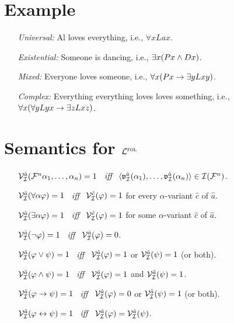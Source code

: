 \documentclass[a4paper, 11pt]{article} %
\begin{document}
\section*{Example}

\begin{enumerate}
  \item[\it Universal:] Al loves everything, i.e., $\forall xLax$.
  \item[\it Existential:] Someone is dancing, i.e., $\exists x(Px \wedge Dx)$.
  \item[\it Mixed:] Everyone loves someone, i.e., $\forall x(Px \rightarrow \exists yLxy)$. 
  \item[\it Complex:] Everything everything loves loves something, i.e., $\forall x(\forall yLyx \rightarrow \exists zLxz)$.
\end{enumerate}



\section*{Semantics for $\mathcal{L}^{\textsc{fol}}$}

\begin{enumerate}
  \item[] $\mathcal{V}_{\mathcal{I}}^{\hat{a}}(\mathcal{F}^n\alpha_1,\ldots,\alpha_n)=1$ ~\textit{iff}~ $\langle\mathfrak{v}_{\mathcal{I}}^{\hat{a}}{(\alpha_1)},\ldots,\mathfrak{v}_{\mathcal{I}}^{\hat{a}}{(\alpha_n)}\rangle\in\mathcal{I}(\mathcal{F}^n)$.
  \item[] $\mathcal{V}_{\mathcal{I}}^{\hat{a}}(\forall\alpha\varphi)=1$ ~\textit{iff}~ $\mathcal{V}_{\mathcal{I}}^{\hat{c}}(\varphi)=1$ for every $\alpha$-variant $\hat{c}$ of $\hat{a}$.
  \item[] $\mathcal{V}_{\mathcal{I}}^{\hat{a}}(\exists\alpha\varphi)=1$ ~\textit{iff}~ $\mathcal{V}_{\mathcal{I}}^{\hat{c}}(\varphi)=1$ for some $\alpha$-variant $\hat{c}$ of $\hat{a}$.
  \item[] $\mathcal{V}_{\mathcal{I}}^{\hat{a}}(\neg\varphi)=1$ ~\textit{iff}~ $\mathcal{V}_{\mathcal{I}}^{\hat{a}}(\varphi)=0$.
  \item[] $\mathcal{V}_{\mathcal{I}}^{\hat{a}}(\varphi \vee \psi)=1$ ~\textit{iff}~ $\mathcal{V}_{\mathcal{I}}^{\hat{a}}(\varphi)=1$ or $\mathcal{V}_{\mathcal{I}}^{\hat{a}}(\psi)=1$ (or both).
  \item[] $\mathcal{V}_{\mathcal{I}}^{\hat{a}}(\varphi \wedge \psi)=1$ ~\textit{iff}~ $\mathcal{V}_{\mathcal{I}}^{\hat{a}}(\varphi)=1$ and $\mathcal{V}_{\mathcal{I}}^{\hat{a}}(\psi)=1$.
  \item[] $\mathcal{V}_{\mathcal{I}}^{\hat{a}}(\varphi \rightarrow \psi)=1$ ~\textit{iff}~ $\mathcal{V}_{\mathcal{I}}^{\hat{a}}(\varphi)=0$ or $\mathcal{V}_{\mathcal{I}}^{\hat{a}}(\psi)=1$ (or both).
  \item[] $\mathcal{V}_{\mathcal{I}}^{\hat{a}}(\varphi \leftrightarrow \psi)=1$ ~\textit{iff}~ $\mathcal{V}_{\mathcal{I}}^{\hat{a}}(\varphi)=\mathcal{V}_{\mathcal{I}}^{\hat{a}}(\psi)$.
\end{enumerate}
\end{document}
